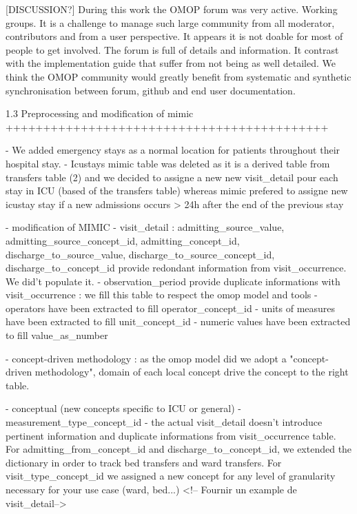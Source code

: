 [DISCUSSION?] During this work the OMOP forum was very active. Working groups.
It is a challenge to manage such large community from all moderator,
contributors and from a user perspective. It appears it is not doable for most
of people to get involved. The forum is full of details and information. It
contrast with the implementation guide that suffer from not being as well
detailed. We think the OMOP community would greatly benefit from systematic
and synthetic synchronisation between forum, github and end user documentation.

1.3 Preprocessing and modification of mimic
+++++++++++++++++++++++++++++++++++++++++++

- We added emergency stays as a normal location for patients throughout their
  hospital stay.
- Icustays mimic table was deleted as it is a derived table from transfers
  table (2) and we decided to assigne a new new visit_detail pour each stay in
  ICU (based of the transfers table) whereas mimic prefered to assigne new
  icustay stay if a new admissions occurs > 24h after the end of the previous
  stay


- modification of MIMIC
	- visit_detail : admitting_source_value, admitting_source_concept_id, admitting_concept_id, discharge_to_source_value, discharge_to_source_concept_id, discharge_to_concept_id provide redondant information from visit_occurrence. We did't populate it.
	- observation_period provide duplicate informations with visit_occurrence : we fill this table to respect the omop model and tools
	- operators have been extracted to fill operator_concept_id
	- units of measures have been extracted to fill unit_concept_id
	- numeric values have been extracted to fill value_as_number


- concept-driven methodology : as the omop model did we adopt a "concept-driven
  methodology", domain of each local concept drive the concept to the right
  table.

	- conceptual (new concepts specific to ICU or general)
		- measurement_type_concept_id
		- the actual visit_detail doesn't introduce pertinent information and duplicate informations from visit_occurrence table. For admitting_from_concept_id and discharge_to_concept_id, we extended the dictionary in order to track bed transfers and ward transfers. For visit_type_concept_id we assigned a new concept for any level of granularity necessary for your use case (ward, bed...) 
		<!-- Fournir un example de visit_detail-->


